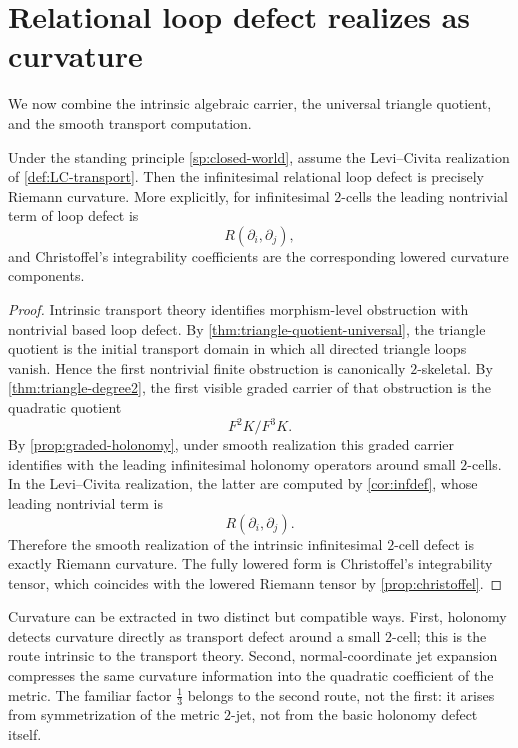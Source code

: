 \section{Relational loop defect realizes as curvature}
We now combine the intrinsic algebraic carrier, the universal triangle
quotient, and the smooth transport computation.
\begin{theorem}
	\label{thm:christoffel-main}
	Under the standing principle \cref{sp:closed-world}, assume the
	Levi--Civita realization of \cref{def:LC-transport}. Then the
	infinitesimal relational loop defect is precisely Riemann curvature.
	More explicitly, for infinitesimal
	\(2\)-cells the leading nontrivial term of loop defect is
	\[
		R(\partial_i,\partial_j),
	\]
	and Christoffel's integrability coefficients are the corresponding
	lowered curvature components.
\end{theorem}
\begin{proof}
	Intrinsic transport theory identifies morphism-level obstruction with
	nontrivial based loop defect.  By
	\cref{thm:triangle-quotient-universal}, the triangle quotient is the
	initial transport domain in which all directed triangle loops vanish.
	Hence the first nontrivial finite obstruction is canonically
	\(2\)-skeletal.
	By \cref{thm:triangle-degree2}, the first visible graded carrier of
	that obstruction is the quadratic quotient
	\[
		F^2K/F^3K.
	\]
	By \cref{prop:graded-holonomy}, under smooth realization this graded
	carrier identifies with the leading infinitesimal holonomy operators
	around small \(2\)-cells.
	In the Levi--Civita realization, the latter are computed by
	\cref{cor:infdef}, whose leading nontrivial term is
	\[
		R(\partial_i,\partial_j).
	\]
	Therefore the smooth realization of the intrinsic infinitesimal
	\(2\)-cell defect is exactly Riemann curvature.
	The fully lowered form is Christoffel's integrability tensor, which
	coincides with the lowered Riemann tensor by
	\cref{prop:christoffel}.
\end{proof}
\begin{remark}
	Curvature can be extracted in two distinct but compatible ways.
	First, holonomy detects curvature directly as transport defect around a
	small \(2\)-cell; this is the route intrinsic to the transport theory.
	Second, normal-coordinate jet expansion compresses the same curvature
	information into the quadratic coefficient of the metric.  The familiar
	factor \(\tfrac13\) belongs to the second route, not the first: it
	arises from symmetrization of the metric \(2\)-jet, not from the basic
	holonomy defect itself.
\end{remark}
